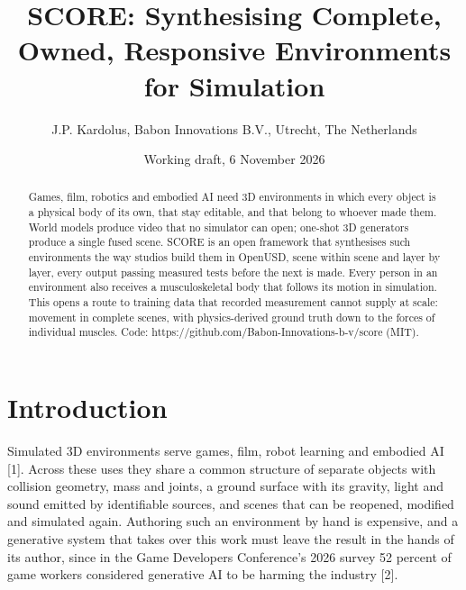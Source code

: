 \documentclass[
  11pt,
]{article}
\title{SCORE: Synthesising Complete, Owned, Responsive Environments for
Simulation}
\author{J.P. Kardolus, Babon Innovations B.V., Utrecht, The Netherlands}
\date{Working draft, 6 November 2026}
\begin{document}
\maketitle
\begin{abstract}
Games, film, robotics and embodied AI need 3D environments in which
every object is a physical body of its own, that stay editable, and that
belong to whoever made them. World models produce video that no
simulator can open; one-shot 3D generators produce a single fused scene.
SCORE is an open framework that synthesises such environments the way
studios build them in OpenUSD, scene within scene and layer by layer,
every output passing measured tests before the next is made. Every
person in an environment also receives a musculoskeletal body that
follows its motion in simulation. This opens a route to training data
that recorded measurement cannot supply at scale: movement in complete
scenes, with physics-derived ground truth down to the forces of
individual muscles. Code: https://github.com/Babon-Innovations-b-v/score
(MIT).
\end{abstract}

\makeatletter{}\makeatother\renewcommand{\topfraction}{0.9}\renewcommand{\textfraction}{0.1}

\begin{center}\end{center}

\section{Introduction}\label{introduction}

Simulated 3D environments serve games, film, robot learning and embodied
AI {[}1{]}. Across these uses they share a common structure of separate
objects with collision geometry, mass and joints, a ground surface with
its gravity, light and sound emitted by identifiable sources, and scenes
that can be reopened, modified and simulated again. Authoring such an
environment by hand is expensive, and a generative system that takes
over this work must leave the result in the hands of its author, since
in the Game Developers Conference's 2026 survey 52 percent of game
workers considered generative AI to be harming the industry {[}2{]}.
\end{document}
